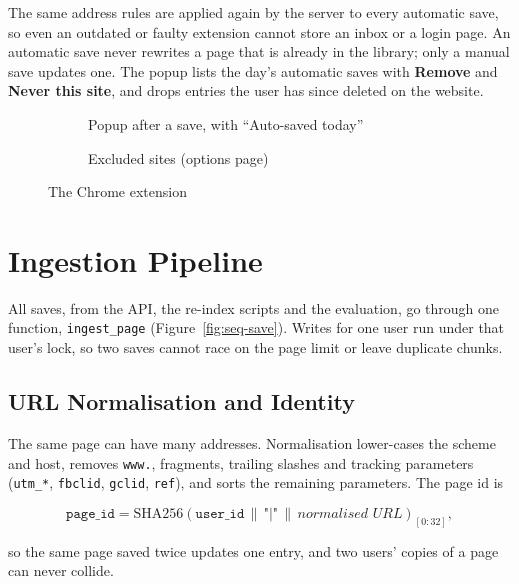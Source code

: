 The same address rules are applied again by the server to every automatic
save, so even an outdated or faulty extension cannot store an inbox or a
login page. An automatic save never rewrites a page that is already in the
library; only a manual save updates one. The popup lists the day's automatic
saves with \textbf{Remove} and \textbf{Never this site}, and drops entries the
user has since deleted on the website.

\begin{figure}[!htbp]
\centering
\begin{subfigure}[b]{0.52\textwidth}
  \centering
  \caption{Popup after a save, with ``Auto-saved today''}
\end{subfigure}\hfill
\begin{subfigure}[b]{0.44\textwidth}
  \centering
  \caption{Excluded sites (options page)}
\end{subfigure}
\caption{The Chrome extension}
\label{fig:extension}
\end{figure}

\section{Ingestion Pipeline}

All saves, from the API, the re-index scripts and the evaluation, go through
one function, \texttt{ingest\_page} (Figure~\ref{fig:seq-save}). Writes for one
user run under that user's lock, so two saves cannot race on the page
limit or leave duplicate chunks.

\subsection{URL Normalisation and Identity}

The same page can have many addresses. Normalisation lower-cases the scheme
and host, removes \texttt{www.}, fragments, trailing slashes and tracking
parameters (\texttt{utm\_*}, \texttt{fbclid}, \texttt{gclid}, \texttt{ref}),
and sorts the remaining parameters. The page id is

\[
\texttt{page\_id} = \mathrm{SHA256}(\texttt{user\_id} \,\|\, \texttt{"|"} \,\|\, \textit{normalised URL})_{[0:32]},
\]

so the same page saved twice updates one entry, and two users' copies of a
page can never collide.

